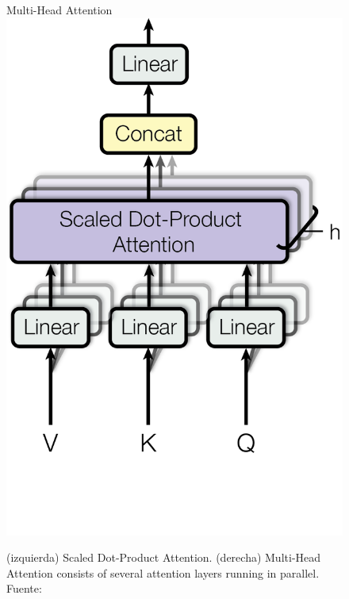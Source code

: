 \begin{figure}[H]
\begin{minipage}[f]{0.5\textwidth}
\end{minipage}
\begin{minipage}[f]{0.5\textwidth}
  \centering 
  Multi-Head Attention \\
  \vspace{0.1cm}
  \includegraphics[scale=0.6]{plantilla-libro/ModalNet-20.png}  
\end{minipage}



  \caption{(izquierda) Scaled Dot-Product Attention. (derecha) Multi-Head Attention consists of several attention layers running in parallel. Fuente: \cite{vaswani2023attention}}
  \label{fig:multi-head-att}
\end{figure}
\newpage
